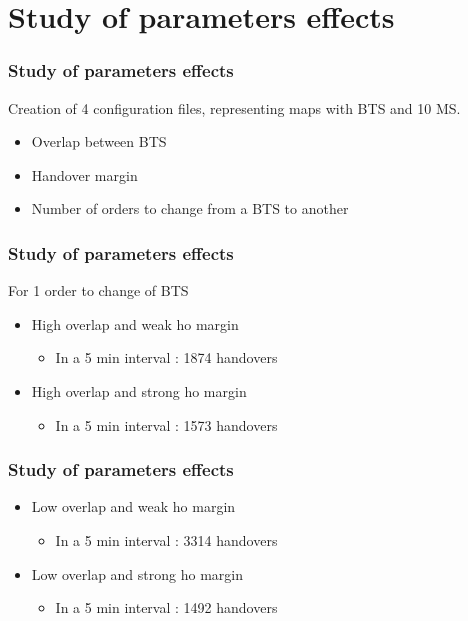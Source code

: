 \documentclass{beamer}
\begin{document}
\section{Study of parameters effects}
\begin{frame}
\frametitle{Study of parameters effects}
Creation of 4 configuration files, representing maps with BTS and 10 MS.
\begin{itemize}
 \item Overlap between BTS
 \item Handover margin
 \item Number of orders to change from a BTS to another
\end{itemize}
\end{frame}
\begin{frame}
\frametitle{Study of parameters effects}
For 1 order to change of BTS
\begin{itemize}
 \item High overlap and weak ho margin
  \begin{itemize}
    \item In a 5 min interval : 1874 handovers
  \end{itemize}
 \item High overlap and strong ho margin
  \begin{itemize}
    \item In a 5 min interval : 1573 handovers
  \end{itemize}
\end{itemize}
\end{frame}
\begin{frame}
\frametitle{Study of parameters effects}
\begin{itemize}
 \item Low overlap and weak ho margin
  \begin{itemize}
    \item In a 5 min interval : 3314 handovers
  \end{itemize}
 \item Low overlap and strong ho margin
  \begin{itemize}
    \item In a 5 min interval : 1492 handovers
  \end{itemize}
\end{itemize}
\end{frame}
\end{document}
